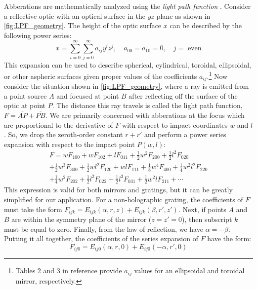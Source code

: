 Abberations are mathematically analyzed using the \textit{light path function} \cite{nodaGeometricTheoryGrating1974,howellsMirrorsSynchrotronRadiationBeamlines1994,polettoMicrofocusingAttosecondPulses2013}. Consider a reflective optic with an optical surface in the $yz$ plane as shown in \cref{fig:LPF_geometry}. The height of the optic surface $x$ can be described by the following power series:
\begin{equation}
x = \sum_{i=0}^{\infty} \sum_{j=0}^{\infty} a_{ij} y^i z^j, \quad a_{00} = a_{10} = 0, \quad j = \textrm{ even}
\label{eqn:mirror_power_series}
\end{equation}
This expansion can be used to describe spherical, cylindrical, toroidal, ellipsoidal, or other aspheric surfaces given proper values of the coefficients $a_{ij}$.\footnote{Tables 2 and 3 in reference \cite{howellsMirrorsSynchrotronRadiationBeamlines1994} provide $a_{ij}$ values for an ellipsoidal and toroidal mirror, respectively.} Now consider the situation shown in \cref{fig:LPF_geometry}, where a ray is emitted from a point source $A$ and focused at point $B$ after reflecting off the surface of the optic at point $P$. The distance this ray travels is called the light path function, $F = \overline{AP} + \overline{PB}$. 
We are primarily concerned with abberations at the focus which are proportional to the derivative of $F$ with respect to impact coordinates $w$ and $l$. So, we drop the zeroth-order constant $r + r'$ and perform a power series expansion with respect to the impact point $P(w,l)$:
\begin{multline}
F = w F_{100} + w F_{102} + l F_{011} + \frac{1}{2} w^2 F_{200}+ \frac{1}{2} l^2 F_{020} \\
+ \frac{1}{2} w^3 F_{300} + \frac{1}{2} w l^2 F_{120} + w l F_{111} + \frac{1}{8} w^4 F_{400} + \frac{1}{4} w^2 l^2 F_{220} \\
+ \frac{1}{4} w^2 F_{202} + \frac{1}{2} l^2 F_{022} + \frac{1}{2} l^3 F_{031} + \frac{1}{2} w^2 l F_{211} + \cdots
\label{eqn:LPF_Fijk}
\end{multline}
This expression is valid for both mirrors and gratings, but it can be greatly simplified for our application. For a non-holographic grating, the coefficients of $F$ must take the form $F_{ijk} = E_{ijk}(\alpha, r, z) + E_{ijk}(\beta, r', z')$. Next, if points $A$ and $B$ are within the symmetry plane of the mirror ($z=z'=0$), then subscript $k$ must be equal to zero. Finally, from the law of reflection, we have $\alpha = -\beta$. Putting it all together, the coefficients of the series expansion of $F$ have the form:
\begin{equation}
F_{ij0} = E_{ij0}(\alpha, r, 0) + E_{ij0}(-\alpha, r', 0)
\end{equation}

